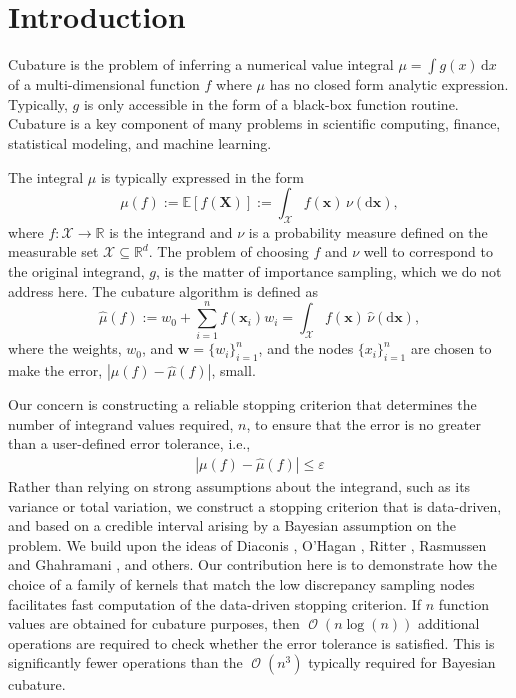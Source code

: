 \documentclass[twocolumn]{svjour3}          %
\DeclareMathOperator{\Order}{{\mathcal O}}
\newcommand{\bm}[1]{\boldsymbol{#1}}
\newcommand{\dif}[1]{\text{d}{#1}}
\newcommand{\reals}{\mathbb{R}}
\newcommand{\Ex}{\mathbb{E}}
\newcommand{\cx}{\mathcal{X}}
\newcommand{\vw}{\bm{w}}
\newcommand{\vx}{\bm{x}}
\newcommand{\hmu}{\hat{\mu}}
\newcommand{\errtol}{\varepsilon}
\def\abs#1{\ensuremath{\left \lvert #1 \right \rvert}}
\begin{document}
\section{Introduction}
\label{intro}
Cubature is the problem of inferring a numerical value integral 
$\mu = \int g(x) \, \dif x$ of a multi-dimensional function $f$ where $\mu$ has no closed form analytic expression. Typically, $g$ is only accessible in the form of a black-box function routine. 
Cubature is a key component of many problems in scientific computing, finance, statistical modeling, and machine learning.  




The integral $\mu$ is typically expressed in the form
\begin{equation}
\label{eqn:defn_mu}
\mu(f) := \Ex[f(\bm{X})] := \int_{\mathcal{X}} f(\vx)\, \nu(\dif\vx),
\end{equation}
where $f:\cx \to \reals$ is the integrand and $\nu$ is a probability measure defined on the measurable set $\cx \subseteq \reals^d$.  The problem of choosing $f$ and $\nu$ well to correspond to the original integrand, $g$, is the matter of importance sampling, which we do not address here.  The cubature algorithm is defined as
\begin{equation}
\label{eqn:defn_hmu}  %
\hmu(f) := w_0 + \sum_{i=1}^{n} f(\vx_i) w_i = \int_{\mathcal{X}} f(\vx)\, \hat{\nu}(\dif\vx),
\end{equation}
where the weights, $w_0$, and  $\vw = \{w_i\}_{i=1}^n$, and the nodes $\{x_i\}_{i=1}^n$ are chosen to make the error, $\abs{\mu(f) - \hmu(f)}$, small.

Our concern is constructing a reliable stopping criterion that determines the number of integrand values required, $n$, to ensure that the error is no greater than a user-defined error tolerance, i.e., 
\begin{align}
\label{eqn:err_crit} 
\abs{\mu(f) - \hmu(f)} \leq \errtol 
\end{align}
Rather than relying on strong assumptions about the integrand, such as its variance or total variation, we construct a stopping criterion that is data-driven, and based on a credible interval arising by a Bayesian assumption on the problem.  We build upon the ideas of Diaconis \cite{DiaconisBayesian}, O'Hagan \cite{HagenBayes}, Ritter \cite{RiterAverage}, Rasmussen and Ghahramani \cite{RasmussenBayesian}, and others.  Our contribution here is to demonstrate how the choice of a family of kernels that match the low discrepancy sampling nodes facilitates fast computation of the data-driven stopping criterion.  If $n$ function values are obtained for cubature purposes, then $\Order(n \log(n))$ additional operations are required to check whether the error tolerance is satisfied.  This is significantly fewer operations than the $\Order(n^3)$ typically required for Bayesian cubature.
\end{document}
